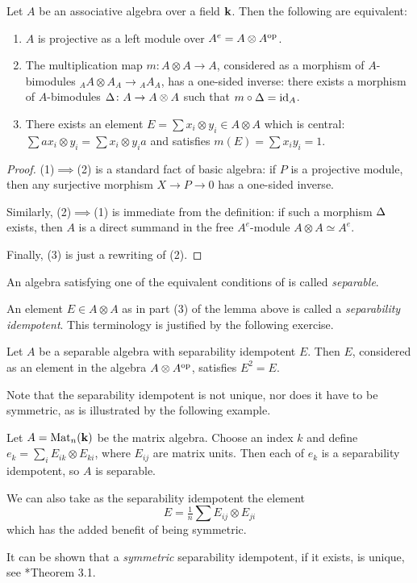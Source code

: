 \begin{lemma}\label{l:separable}
  Let $A$ be an associative algebra over a field $\mathbf{k}$.
  Then the following are equivalent:
  \begin{enumerate}
    \item $A$ is projective as a left module over $A^e=A\otimes A^{\mathrm{op}}$.
    \item The multiplication map $m\colon A\otimes A\to A$,
      considered as a morphism of $A$-bimodules
      ${}_AA\otimes A_A \to {}_A A_A$,
      has a one-sided inverse: there exists a morphism of $A$-bimodules
      $\Delta\colon A\to A\otimes A$ such that $m\circ \Delta=\operatorname{id}_A$.
   \item There exists an element $E=\sum x_i\otimes y_i\in A\otimes A$ which
     is central: $\sum ax_i \otimes y_i=\sum x_i \otimes y_ia$ and satisfies
     $m(E)=\sum x_iy_i=1$.
   \end{enumerate}
\end{lemma}
\begin{proof}
  (1)$\implies$(2) is a standard fact of basic algebra: if $P$ is a projective
  module, then any surjective morphism $X\to P\to 0$ has a one-sided inverse.

  Similarly, (2)$\implies$(1) is immediate from the definition: if such a
  morphism $\Delta$ exists, then $A$ is a direct summand in
  the free $A^e$-module $A\otimes A\simeq A^e$.

  Finally, (3) is just a rewriting of (2).
\end{proof}
\begin{definition}\label{d:separable}
  An algebra satisfying one of the equivalent conditions of 
  is called \emph{separable}.
\end{definition}
An element $E\in A\otimes A$ as in part (3) of the lemma above is called a
\emph{separability idempotent}. This terminology
is justified by the following exercise.
\begin{exercise}\label{ec:separability-idempotent}
  Let $A$ be a separable algebra with separability idempotent $E$.
  Then $E$, considered as an element in the algebra $A\otimes A^{\mathrm{op}}$,
  satisfies $E^2=E$.
\end{exercise}


Note that the separability idempotent is not unique, nor does it have
to be symmetric, as is illustrated by the following example.
\begin{example}\label{x:matrix}
  Let $A=\operatorname{Mat}_n(\mathbf{k})$ be the matrix algebra. Choose an index $k$ and define
  $e_k=\sum_i E_{ik}\otimes E_{ki}$, where $E_{ij}$ are matrix units.
  Then each of $e_k$ is a separability idempotent, so $A$ is separable.

  We can also take as the separability idempotent the element
  $$
    E=\tfrac{1}{n}\sum E_{ij}\otimes E_{ji}
  $$
  which has the added benefit of being symmetric.
\end{example}
\begin{remark}
  It can be shown that a \emph{symmetric} separability idempotent, if it exists, is
  unique, see *{Theorem 3.1}.
\end{remark}


